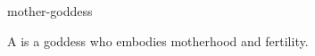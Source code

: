 \documentclass{stex}
\begin{document}
\begin{smodule}{mother-goddess}
\begin{sparagraph}[style=symdoc]
A  is a goddess who embodies motherhood and fertility.
\end{sparagraph}
\end{smodule}
\end{document}
